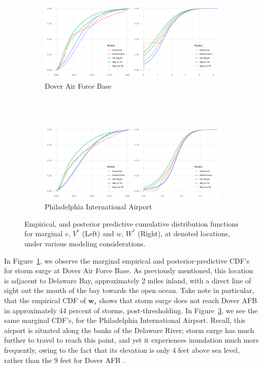 \begin{figure}[ht]
    \centering
    \begin{subfigure}{0.8\textwidth}
        \caption{Dover Air Force Base\label{plot:marginal_doverafb}}
        \includegraphics[width=\textwidth]{./plots/delaware_marginal_dover_afb.png}
    \end{subfigure}
    \\\vspace{1cm}~\\
    \begin{subfigure}{0.8\textwidth}
        \caption{Philadelphia International Airport\label{plot:marginal_pia}}
        \includegraphics[width=\textwidth]{./plots/delaware_marginal_phil_ia.png}    
    \end{subfigure}
    \caption{Empirical, and posterior predictive cumulative distribution functions for marginal 
    $v$, $V^*$ (Left) and $w$, $W^*$ (Right), at denoted locations, under various modeling
    considerations.}
\end{figure}

In Figure~\ref{plot:marginal_doverafb}, we observe the marginal empirical and posterior-predictive
    CDF's for storm surge at Dover Air Force Base.  As previously mentioned, this location is adjacent
    to Delaware Bay, approximately 2 miles inland, with a direct line of sight out the mouth of the
    bay towards the open ocean.  Take note in particular, that the empirical CDF of $\bm{w}_s$ shows
    that storm surge does not reach Dover AFB in approximately \num{44} percent of storms, 
    post-thresholding.
In Figure~\ref{plot:marginal_pia}, we see the same marginal CDF's, for the Philadelphia International
    Airport.  Recall, this airport is situated along the banks of the Delaware River; storm surge
    has much further to travel to reach this point, and yet it experiences inundation much more 
    frequently, owing to the fact that its elevation is only 4 feet above sea level, 
    rather than the 9 feet for Dover AFB \makenote{[confirm]}.

